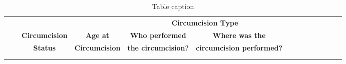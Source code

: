 \documentclass{article}
\begin{document}
\begin{appendix}
{\linespread{1}
\small
\begin{longtable}[c]{ll ccc ccc ccc ccc}
      \hline
      \multicolumn{1}{l}{} & &  &  & \multicolumn{2}{c}{\bf Circumcision Type} \\ 
      \cmidrule(lr){5-7}
       & & {\bf Circumcision} & {\bf Age at} & {\bf Who performed} & {\bf Where was the}  \\
       & & {\bf Status} & {\bf Circumcision} & {\bf the circumcision?} & {\bf circumcision performed?} \\[5pt]
      \hline
      \vspace{-5pt}
      \endhead
      \\[-5pt]\hline
      \caption{Table caption}
      \endfoot
      

\end{longtable}}
\end{appendix}
\end{document}
